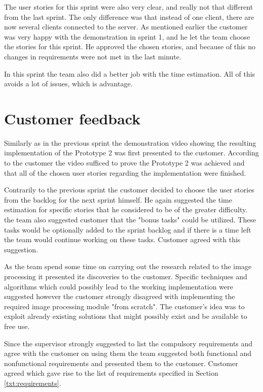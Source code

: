 The user stories for this sprint were also very clear, and really not that different from the last sprint. 
The only difference was that instead of one client, there are now several clients connected to the server. 
As mentioned earlier the customer was very happy with the demonstration in sprint 1, and he let the team choose the stories for this sprint. 
He approved the chosen stories, and because of this no changes in requirements were not met in the last minute.
 
In this sprint the team also did a better job with the time estimation. 
All of this avoids a lot of issues, which is advantage. 
  
\section{Customer feedback}
Similarly as in the previous sprint the demonstration video showing the resulting implementation of the Prototype 2 was first presented to the customer. According to the customer the video sufficed to prove the Prototype 2 was achieved and that all of the chosen user stories regarding the implementation were finished.

Contrarily to the previous sprint the customer decided to choose the user stories from the backlog for the next sprint himself. He again suggested the time estimation for specific stories that he considered to be of the greater difficulty. the team also suggested customer that the "bonus tasks" could be utilized. These tasks would be optionally added to the sprint backlog and if there is a time left the team would continue working on these tasks. Customer agreed with this suggestion.

As the team spend some time on carrying out the research related to the image processing it presented its discoveries to the customer. Specific techniques and algorithms which could possibly lead to the working implementation were suggested however the customer strongly disagreed with implementing the required image processing module "from scratch". The customer's idea was to exploit already existing solutions that might possibly exist and be available to free use.

Since the supervisor strongly suggested to list the compulsory requirements and agree with the customer on using them the team suggested both functional and nonfunctional requirements and presented them to the customer. Customer agreed which gave rise to the list of requirements specified in Section \ref{txt:requirements}.

